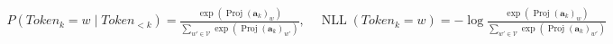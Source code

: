 ﻿\documentclass{article}
\begin{document}
\begin{preview}
\(\displaystyle
\begin{gathered}
  P(\mathit{Token}_k=w\mid \mathit{Token}_{<k})
  =
  \frac{\exp(\operatorname{Proj}(\bm a_k)_w)}
  {\sum_{w'\in\mathcal{V}}\exp(\operatorname{Proj}(\bm a_k)_{w'})}, \quad
  \operatorname{NLL}(\mathit{Token}_k=w)
  =
  -\log
  \frac{\exp(\operatorname{Proj}(\bm a_k)_w)}
  {\sum_{w'\in\mathcal{V}}\exp(\operatorname{Proj}(\bm a_k)_{w'})}
\end{gathered}
\)
\end{preview}
\end{document}
